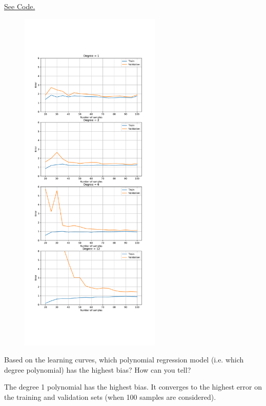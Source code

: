 \begin{solution}
  \href{https://colab.research.google.com/drive/1dpAjkdJBpwEjfHmlaW9MwR8lAUgAxqwK?usp=sharing}{See Code.} 
  \begin{figure}[H]
    \centering
    \includegraphics[width=0.6\textwidth]{images/fig1.pdf}
  \end{figure}

\end{solution}

\begin{problem}[3]
  Based on the learning curves, which polynomial regression model (i.e. which degree polynomial) has the highest bias? How can you tell?
\end{problem}
\begin{solution}
  The degree 1 polynomial has the highest bias. It converges to the highest error on the training and validation sets (when 100 samples are considered).
\end{solution}

